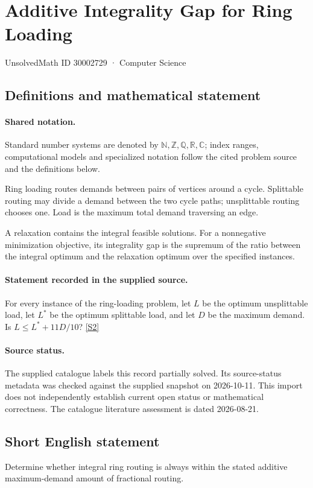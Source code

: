 \documentclass[11pt]{article}
\newcommand{\sref}[2]{\hyperlink{source:#1:#2}{[S#2]}}
\begin{document}
\setcounter{section}{30002728}
\section{Additive Integrality Gap for Ring Loading}\label{30002729}
{\small\sffamily UnsolvedMath ID 30002729 · Computer Science}
\subsection{Definitions and mathematical statement}

\paragraph{Shared notation.}Standard number systems are denoted by $\mathbb N,\mathbb Z,\mathbb Q,\mathbb R,\mathbb C$; index ranges, computational models and specialized notation follow the cited problem source and the definitions below.


Ring loading routes demands between pairs of vertices around a cycle. Splittable routing may divide a demand between the two cycle paths; unsplittable routing chooses one. Load is the maximum total demand traversing an edge.

A relaxation contains the integral feasible solutions. For a nonnegative minimization objective, its integrality gap is the supremum of the ratio between the integral optimum and the relaxation optimum over the specified instances.
\paragraph{Statement recorded in the supplied source.}
For every instance of the ring-loading problem, let $L$ be the optimum unsplittable load, let $L^*$ be the optimum splittable load, and let $D$ be the maximum demand. Is $L\leq L^*+11D/10$? \sref{30002729}{2}
\paragraph{Source status.}
The supplied catalogue labels this record partially solved. Its source-status metadata was checked against the supplied snapshot on 2026-10-11. This import does not independently establish current open status or mathematical correctness. The catalogue literature assessment is dated 2026-08-21.
\subsection{Short English statement}
Determine whether integral ring routing is always within the stated additive maximum-demand amount of fractional routing.
\end{document}
